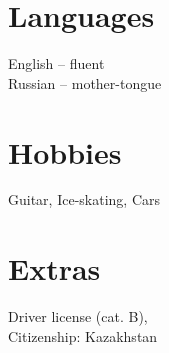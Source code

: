 \documentclass[]{deedy-resume-openfont}
\begin{document}
\begin{minipage}[t]{0.32\textwidth}
\section{Languages}
    English -- fluent\\
    Russian -- mother-tongue
\sectionsep

\section{Hobbies}
    Guitar, Ice-skating, Cars
\sectionsep

\section{Extras}
    Driver license (cat. B),\\
    Citizenship: Kazakhstan
\sectionsep
%
%

\end{minipage} 
\hfill
\end{document}
